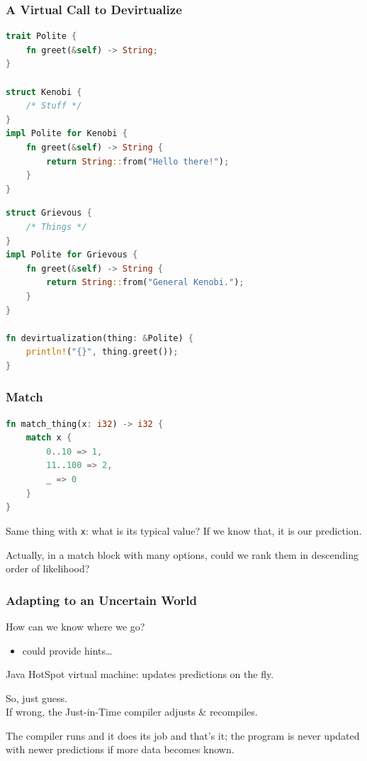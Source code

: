 \begin{frame}[fragile]
\frametitle{A Virtual Call to Devirtualize}

\begin{multicols}{2}
\begin{lstlisting}[language=Rust]
trait Polite {
    fn greet(&self) -> String;
}

struct Kenobi {
    /* Stuff */
}
impl Polite for Kenobi {
    fn greet(&self) -> String {
        return String::from("Hello there!");
    }
}
\end{lstlisting}
\columnbreak
\begin{lstlisting}[language=Rust]
struct Grievous {
    /* Things */
}
impl Polite for Grievous {
    fn greet(&self) -> String {
        return String::from("General Kenobi.");
    }
}

fn devirtualization(thing: &Polite) {
    println!("{}", thing.greet());
}

\end{lstlisting}
\end{multicols}

\end{frame}


\begin{frame}[fragile]
\frametitle{Match}

\begin{lstlisting}[language=Rust]
fn match_thing(x: i32) -> i32 {
    match x {
        0..10 => 1,
        11..100 => 2,
        _ => 0
    }
}
\end{lstlisting}

Same thing with \texttt{x}: what is its typical value? If we know that, it is our prediction. 

Actually, in a match block with many options, could we rank them in descending order of likelihood?

\end{frame}


\begin{frame}
\frametitle{Adapting to an Uncertain World}


How can we know where we go?
\begin{itemize}
\item could provide hints\ldots
\end{itemize}

Java HotSpot virtual machine: updates predictions on the fly. 

So, just guess.\\
If wrong, the Just-in-Time compiler adjusts \& recompiles.

The compiler runs and it does its job and that's it; the program is never updated with newer predictions if more data becomes known.


\end{frame}



